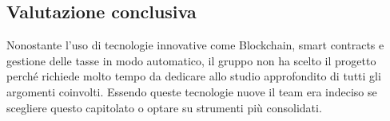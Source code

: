     \subsection{Valutazione conclusiva}
    Nonostante l'uso di tecnologie innovative come Blockchain, smart contracts e gestione delle tasse in modo automatico, il gruppo non ha scelto il progetto perché richiede molto tempo da dedicare allo studio approfondito di tutti gli argomenti coinvolti.
    Essendo queste tecnologie nuove il team era indeciso se scegliere questo capitolato o optare su strumenti più consolidati.